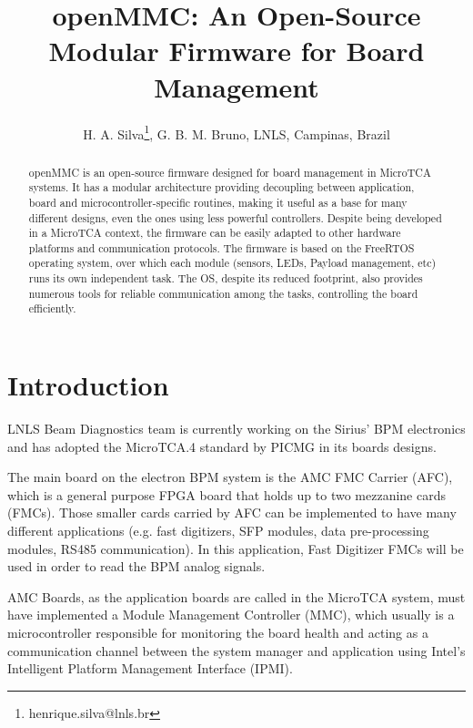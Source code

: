 \documentclass[a4paper,
              ]{jacow}
\begin{document}
\title{openMMC: An Open-Source Modular Firmware for Board Management}

\author{H. A. Silva\thanks{henrique.silva@lnls.br}, G. B. M. Bruno, LNLS, Campinas, Brazil}

\maketitle

%
\begin{abstract}
  openMMC is an open-source firmware designed for board management in MicroTCA systems.
  It has a modular architecture providing decoupling between application,
  board and microcontroller-specific routines, making it useful as a base for many
  different designs, even the ones using less powerful controllers.
  Despite being developed in a MicroTCA context, the firmware can be easily adapted
  to other hardware platforms and communication protocols.
  The firmware is based on the FreeRTOS operating system, over which each module
  (sensors, LEDs, Payload management, etc) runs its own independent task.
  The OS, despite its reduced footprint, also provides numerous tools for reliable
  communication among the tasks, controlling the board efficiently.
\end{abstract}

\section{Introduction}

LNLS Beam Diagnostics team is currently working on the Sirius' BPM electronics and has adopted the MicroTCA.4 standard by PICMG in its boards designs.

The main board on the electron BPM system is the AMC FMC Carrier (AFC), which is a general purpose FPGA board that holds up to two mezzanine cards (FMCs).
Those smaller cards carried by AFC can be implemented to have many different applications (e.g. fast digitizers, SFP modules, data pre-processing modules, RS485 communication). In this application, Fast Digitizer FMCs will be used in order to read the BPM analog signals.

AMC Boards, as the application boards are called in the MicroTCA system, must have implemented a Module Management Controller (MMC), which usually is a microcontroller responsible for monitoring the board health and acting as a communication channel between the system manager and application using Intel's Intelligent Platform Management Interface (IPMI).
\end{document}
